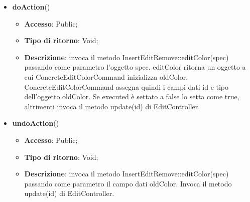 {{{\begin{itemize}
\begin{itemize}
				\end{itemize}
				\item \textbf{doAction}()
				\begin{itemize}
					\item \textbf{Accesso}: Public;
					\item \textbf{Tipo di ritorno}: Void;
					\item \textbf{Descrizione}: invoca il metodo InsertEditRemove::editColor(spec) passando come parametro l'oggetto spec. editColor ritorna un oggetto a cui ConcreteEditColorCommand inizializza oldColor. ConcreteEditColorCommand assegna quindi i campi dati id e tipo dell'oggetto oldColor. Se executed è settato a false lo setta come true, altrimenti invoca il metodo update(id) di EditController.
				\end{itemize}
				\item \textbf{undoAction}()
				\begin{itemize}
					\item \textbf{Accesso}: Public;
					\item \textbf{Tipo di ritorno}: Void;
					\item \textbf{Descrizione}: invoca il metodo InsertEditRemove::editColor(spec) passando come parametro il campo dati oldColor. Invoca il metodo update(id) di EditController.
				\end{itemize}
			\end{itemize}
			}
			
}}
